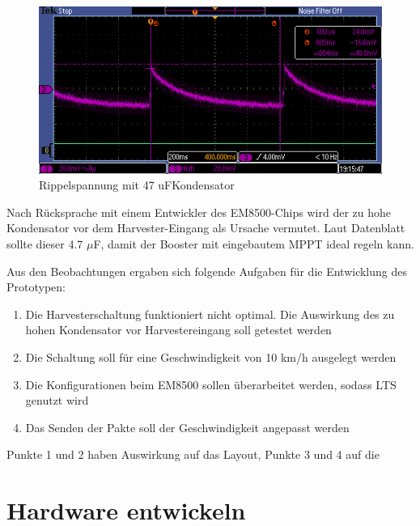 \begin{figure}
    \includegraphics[width=15cm]{3Vorgehen/imag/47uF.PNG}
    \caption{Rippelspannung mit 47 uFKondensator}\label{kond47uF} 
\end{figure}

Nach Rücksprache mit einem Entwickler des EM8500-Chips wird der zu hohe Kondensator vor dem Harvester-Eingang als Ursache vermutet. Laut Datenblatt sollte dieser 4.7 $\mu$F, damit der Booster mit eingebautem MPPT ideal regeln kann.


Aus den Beobachtungen ergaben sich folgende Aufgaben für die Entwicklung des Prototypen:

\begin{enumerate}
    \item Die Harvesterschaltung funktioniert nicht optimal. Die Auswirkung des zu hohen Kondensator vor Harvestereingang soll getestet werden
    \item Die Schaltung soll für eine Geschwindigkeit von 10 km/h ausgelegt werden
    \item Die Konfigurationen beim EM8500 sollen überarbeitet werden, sodass LTS genutzt wird
    \item Das Senden der Pakte soll der Geschwindigkeit angepasst werden
\end{enumerate}

Punkte 1 und 2 haben Auswirkung auf das Layout, Punkte 3 und 4 auf die 








\section{Hardware entwickeln}
                               
